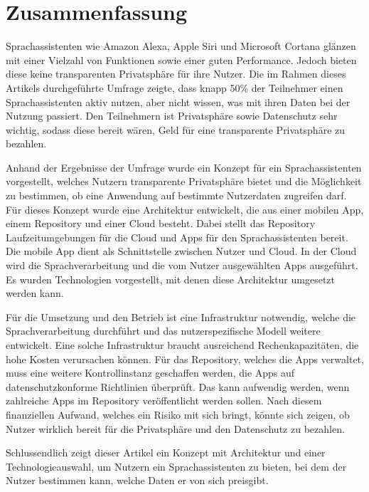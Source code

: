 \section{Zusammenfassung}
Sprachassistenten wie Amazon Alexa, Apple Siri und Microsoft Cortana glänzen mit einer Vielzahl von Funktionen sowie einer guten Performance. Jedoch bieten diese keine transparenten Privatsphäre für ihre Nutzer. Die im Rahmen dieses Artikels durchgeführte Umfrage zeigte, dass knapp 50\% der Teilnehmer einen Sprachassistenten aktiv nutzen, aber nicht wissen, was mit ihren Daten bei der Nutzung passiert. Den Teilnehmern ist Privatsphäre sowie Datenschutz sehr wichtig, sodass diese bereit wären, Geld für eine transparente Privatsphäre zu bezahlen. 

Anhand der Ergebnisse der Umfrage wurde ein Konzept für ein Sprachassistenten vorgestellt, welches Nutzern transparente Privatsphäre bietet und die Möglichkeit zu bestimmen, ob eine Anwendung auf bestimmte Nutzerdaten zugreifen darf. Für dieses Konzept wurde eine Architektur entwickelt, die aus einer mobilen App, einem Repository und einer Cloud besteht. Dabei stellt das Repository Laufzeitumgebungen für die Cloud und Apps für den Sprachassistenten bereit. Die mobile App dient als Schnittstelle zwischen Nutzer und Cloud. In der Cloud wird die Sprachverarbeitung und die vom Nutzer ausgewählten Apps ausgeführt. Es wurden Technologien vorgestellt, mit denen diese Architektur umgesetzt werden kann. 

Für die Umsetzung und den Betrieb ist eine Infrastruktur notwendig, welche die Sprachverarbeitung durchführt und das nutzerspezifische Modell weitere entwickelt. Eine solche Infrastruktur braucht ausreichend Rechenkapazitäten, die hohe Kosten verursachen können. Für das Repository, welches die Apps verwaltet, muss eine weitere Kontrollinstanz geschaffen werden, die Apps auf datenschutzkonforme Richtlinien überprüft. Das kann aufwendig werden, wenn zahlreiche Apps im Repository veröffentlicht werden sollen. Nach diesem finanziellen Aufwand, welches ein Risiko mit sich bringt, könnte sich zeigen, ob Nutzer wirklich bereit für die Privatsphäre und den Datenschutz zu bezahlen. 

Schlussendlich zeigt dieser Artikel ein Konzept mit Architektur und einer Technologieauswahl, um Nutzern ein Sprachassistenten zu bieten, bei dem der Nutzer bestimmen kann, welche Daten er von sich preisgibt. 